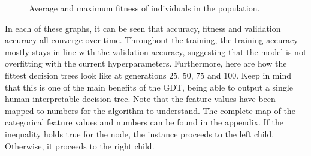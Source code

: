\documentclass[12pt]{article}
\begin{document}
\begin{figure}[H]
    \centering
    \caption{Average and maximum fitness of individuals in the population.}
\end{figure}

In each of these graphs, it can be seen that accuracy, fitness and validation accuracy all converge over time. Throughout the training, the training accuracy mostly stays in line with the validation accuracy, suggesting that the model is not overfitting with the current hyperparameters. Furthermore, here are how the fittest decision trees look like at generations $25$, $50$, $75$ and $100$. Keep in mind that this is one of the main benefits of the GDT, being able to output a single human interpretable decision tree. Note that the feature values have been mapped to numbers for the algorithm to understand. The complete map of the categorical feature values and numbers can be found in the appendix. If the inequality holds true for the node, the instance proceeds to the left child. Otherwise, it proceeds to the right child.
\end{document}
